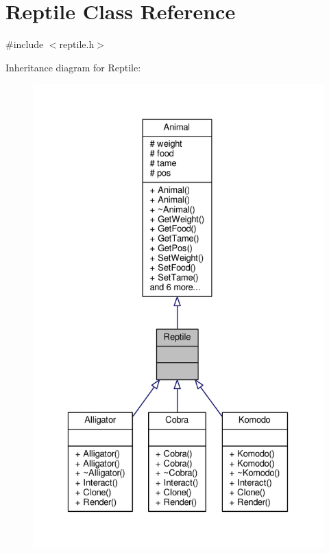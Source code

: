 \hypertarget{classReptile}{}\section{Reptile Class Reference}
\label{classReptile}


{\ttfamily \#include $<$reptile.\+h$>$}



Inheritance diagram for Reptile\+:
\nopagebreak
\begin{figure}[H]
\begin{center}
\leavevmode
\includegraphics[width=329pt]{classReptile__inherit__graph}
\end{center}
\end{figure}


